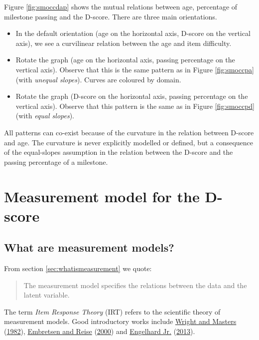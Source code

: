 \documentclass[
]{book}
\begin{document}
Figure \ref{fig:smoccdap} shows the mutual relations between age, percentage of milestone passing and the D-score. There are three main orientations.

\begin{itemize}
\item
  In the default orientation (age on the horizontal axis, D-score on the vertical axis), we see a curvilinear relation between the age and item difficulty.
\item
  Rotate the graph (age on the horizontal axis, passing percentage on the vertical axis). Observe that this is the same pattern as in Figure \ref{fig:smoccpa} (with \emph{unequal slopes}). Curves are coloured by domain.
\item
  Rotate the graph (D-score on the horizontal axis, passing percentage on the vertical axis). Observe that this pattern is the same as in Figure \ref{fig:smoccpd} (with \emph{equal slopes}).
\end{itemize}

All patterns can co-exist because of the curvature in the relation between D-score and age. The curvature is never explicitly modelled or defined, but a consequence of the equal-slopes assumption in the relation between the D-score and the passing percentage of a milestone.

\hypertarget{sec:measurementmodel}{%
\section{Measurement model for the D-score}\label{sec:measurementmodel}}

\hypertarget{what-are-measurement-models}{%
\subsection{What are measurement models?}\label{what-are-measurement-models}}

From section \ref{sec:whatismeasurement} we quote:

\begin{quote}
The measurement model specifies the relations between the data and the latent variable.
\end{quote}

The term \emph{Item Response Theory} (IRT) refers to the scientific theory of measurement models. Good introductory works include \protect\hyperlink{ref-wright1982}{Wright and Masters} (\protect\hyperlink{ref-wright1982}{1982}), \protect\hyperlink{ref-embretsen2000}{Embretsen and Reise} (\protect\hyperlink{ref-embretsen2000}{2000}) and \protect\hyperlink{ref-engelhard2013}{Engelhard Jr.} (\protect\hyperlink{ref-engelhard2013}{2013}).
\end{document}
